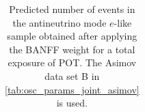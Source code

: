 \begin{table}
\begin{tabular} { | l ||r | r | r | r | r | r | | r | }
\end{tabular}
\caption{
Predicted number of events in the antineutrino mode $e$-like sample
obtained after applying the BANFF weight
for a total exposure of \TotalPotNuBarRunOneSevenC{} POT.
The Asimov data set B in \cref{tab:osc_params_joint_asimov} is used.
}
\label{tab:events_rhc1re_Asimov_B_Run17c}
\end{table}


